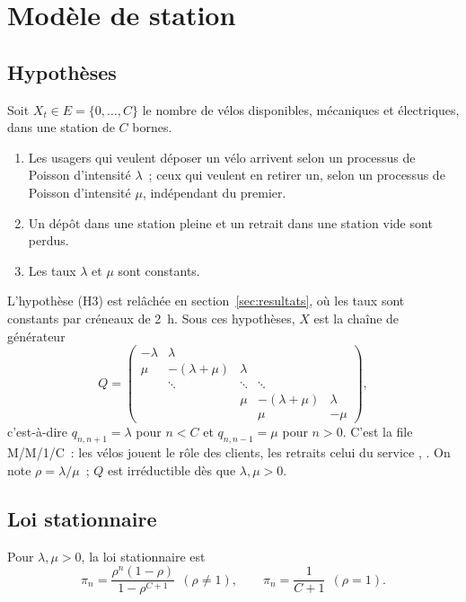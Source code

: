 
\section{Modèle de station}\label{sec:modele}

\subsection{Hypothèses}

Soit $X_t\in E=\{0,\dots,C\}$ le nombre de vélos disponibles, mécaniques et électriques, dans une station de $C$ bornes.
\begin{enumerate}[label=(H\arabic*)]
\item Les usagers qui veulent déposer un vélo arrivent selon un processus de Poisson d'intensité $\lambda$~; ceux qui veulent en retirer un, selon un processus de Poisson d'intensité $\mu$, indépendant du premier.
\item Un dépôt dans une station pleine et un retrait dans une station vide sont perdus.
\item Les taux $\lambda$ et $\mu$ sont constants.
\end{enumerate}
L'hypothèse (H3) est relâchée en section~\ref{sec:resultats}, où les taux sont constants par créneaux de 2~h. Sous ces hypothèses, $X$ est la chaîne de générateur
\[
Q=\begin{pmatrix}
-\lambda & \lambda & & & \\
\mu & -(\lambda+\mu) & \lambda & & \\
 & \ddots & \ddots & \ddots & \\
 & & \mu & -(\lambda+\mu) & \lambda\\
 & & & \mu & -\mu
\end{pmatrix},
\]
c'est-à-dire $q_{n,n+1}=\lambda$ pour $n<C$ et $q_{n,n-1}=\mu$ pour $n>0$. C'est la file M/M/1/C~: les vélos jouent le rôle des clients, les retraits celui du service \cite[§3.5]{STGH18}, \cite{Bre99}. On note $\rho=\lambda/\mu$~; $Q$ est irréductible dès que $\lambda,\mu>0$.

\subsection{Loi stationnaire}

\begin{proposition}\label{prop:pi}
Pour $\lambda,\mu>0$, la loi stationnaire est
\[
\pi_n=\frac{\rho^n(1-\rho)}{1-\rho^{C+1}}\ \ (\rho\neq1),\qquad\pi_n=\frac{1}{C+1}\ \ (\rho=1).
\]
\end{proposition}

